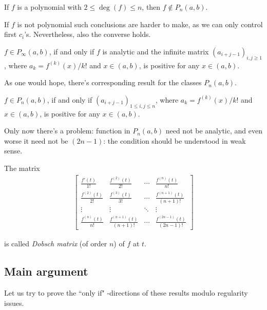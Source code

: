 \begin{prop}
	If $f$ is a polynomial with $2 \leq \deg(f) \leq n$, then $f \notin P_{n}(a, b)$.
\end{prop}

If $f$ is not polynomial such conclusions are harder to make, as we can only control first $c_{i}$'s. Nevertheless, also the converse holds.

\begin{lause}\label{heuristic_loewner}
	$f \in P_{\infty}(a, b)$, if and only if $f$ is analytic and the infinite matrix $(a_{i + j - 1})_{i, j \geq 1}$, where $a_{k} = f^{(k)}(x)/k!$ and $x \in (a, b)$, is positive for any $x \in (a, b)$.
\end{lause}

As one would hope, there's corresponding result for the classes $P_{n}(a, b)$.

\begin{lause}\label{heuristic_main}
	$f \in P_{n}(a, b)$, if and only if $(a_{i + j - 1})_{1 \leq i, j \leq n}$, where $a_{k} = f^{(k)}(x)/k!$ and $x \in (a, b)$, is positive for any $x \in (a, b)$.
\end{lause}

Only now there's a problem: function in $P_{n}(a, b)$ need not be analytic, and even worse it need not be $(2 n - 1)$: the condition should be understood in weak sense.

The matrix
\begin{align*}
	\begin{bmatrix}
		\frac{f'(t)}{1!} & \frac{f^{(2)}(t)}{2!} & \cdots & \frac{f^{(n)}(t)}{n!} \\
		\frac{f^{(2)}(t)}{2!} & \frac{f^{(3)}(t)}{3!} & \cdots & \frac{f^{(n + 1)}(t)}{(n + 1)!} \\
		\vdots & \vdots & \ddots & \vdots \\
		\frac{f^{(n)}(t)}{n!} & \frac{f^{(n + 1)}(t)}{(n + 1)!} & \cdots &  \frac{f^{(2 n - 1)}(t)}{(2 n - 1)!}
	\end{bmatrix}
\end{align*}

is called \textit{Dobsch matrix} (of order $n$) of $f$ at $t$.

\subsection{Main argument}

Let us try to prove the ``only if" -directions of these results modulo regularity issues.

